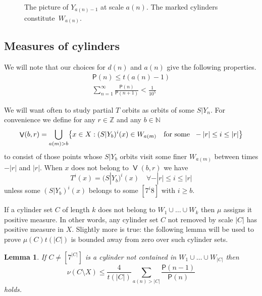 \documentclass[10pt]{amsart}
\newtheorem{lemm}[theo]{Lemma}\newtheorem{prop}[theo]{Proposition}\newtheorem{coro}[theo]{Corollary}\newtheorem{conj}[theo]{Conjecture}
\theoremstyle{definition}\newtheorem{defi}[theo]{Definition}\newtheorem{rema}[theo]{Remark}\newtheorem{exam}[theo]{Example}\newtheorem{exem}[theo]{Example}\newtheorem{nota}[theo]{Notation}
\DeclareMathOperator{\bad}{\mathsf{V}}
\DeclareMathOperator{\Q}{\mathsf{Q}}
\newcommand{\N}{\mathbb{N}}
\newcommand{\Z}{\mathbb{Z}}
\renewcommand{\P}{\mathsf{P}}
\let\originalleft\left
\let\originalright\right
\renewcommand{\left}{\mathopen{}\mathclose\bgroup\originalleft}
\renewcommand{\right}{\aftergroup\egroup\originalright}
\let\oldforall\forall
\renewcommand*{\forall}{\mathrel{\oldforall}}
\begin{document}
\begin{figure}[!h]

\caption{The picture of $Y_{a(n)-1}$ at scale $a(n)$. The marked cylinders constitute~$W_{a(n)}$.}\label{fig:unbounded_removal}
\end{figure}


\subsection{Measures of cylinders}


We will note that our choices for $d(n)$ and $a(n)$ give the following properties.
\begin{align}
\tag{$\rm P1$}
\P(n) \le t(a(n)-1)\label{p:tower_height}\\
\tag{$\rm P2$}\label{p:summing_gaps}
\sum_{n=1}^\infty \frac{\P(n)}{\P(n+1)} < \frac{1}{10^5}
\end{align}


We will want often to study partial $T$ orbits as orbits of some $S|Y_n$. For convenience we define for any $r \in \Z$ and any $b \in \N$
\[
\bad(b,r) = \bigcup_{a(m) > b} \left\{x \in X : (S|Y_b)^i(x) \in W_{a(m)} \quad\text{for some }\; -|r| \le i \le |r| \right\}
\]
to consist of those points whose $S|Y_b$ orbits visit some finer $W_{a(m)}$ between times $-|r|$ and $|r|$. When $x$ does not belong to $\bad(b,r)$ we have
\[
T^i(x) = (S|Y_b)^i(x)\quad \forall -|r| \le i \le |r|
\]
unless some $(S|Y_b)^i(x)$ belongs to some $[7^i 8]$ with $i \ge b$.



If a cylinder set $C$ of length $k$ does not belong to $W_1 \cup \dots \cup W_k$ then $\mu$ assigns it positive measure. In other words, any cylinder set $C$ not removed by scale $|C|$ has positive measure in $X$. Slightly more is true: the following lemma will be used to prove $\mu(C) t(|C|)$ is bounded away from zero over such cylinder sets.

\begin{lemm}\label{lem:cylinder_decay}
If $C \ne [7^{|C|}]$ is a cylinder not contained in $W_1 \cup \dots \cup W_{|C|}$ then
\[
\nu(C \setminus X) \le \frac{4}{t(|C|)} \sum_{a(n) > |C|} \frac{\P(n-1)}{\P(n)}
\]
holds.
\end{lemm}
\end{document}
